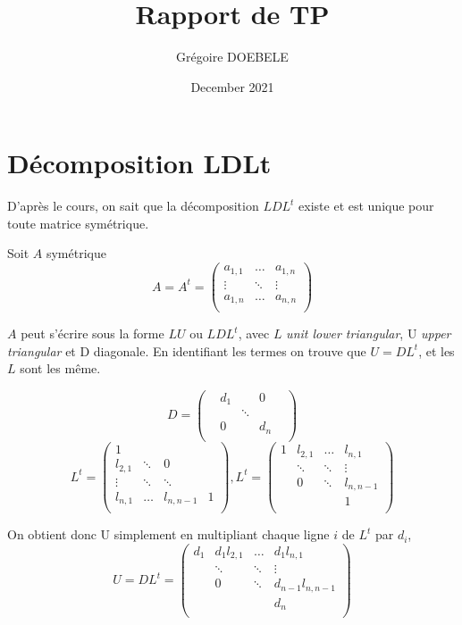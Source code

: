 \documentclass{article}
\title{Rapport de TP}
\author{Grégoire DOEBELE }
\date{December 2021}
\begin{document}
\maketitle

\section{Décomposition LDLt}

D'après le cours, on sait que la décomposition \(LDL^t\) existe et est unique pour toute matrice symétrique.

Soit \(A\) symétrique
\[
	A = A^t = 
	\begin{pmatrix}
	a_{1,1}	& \dots	& a_{1,n} 	\\
	\vdots	& \ddots& \vdots	\\
	a_{1,n}	& \dots & a_{n,n} 	\\
	\end{pmatrix}
\]

\(A\) peut s'écrire sous la forme \(LU\) ou \(LDL^t\), avec \(L\) \textit{unit lower triangular}, U \textit{upper triangular} et D diagonale.
En identifiant les termes on trouve que \(U = DL^t\), et les \(L\) sont les même.

\[
	D = 
	\begin{pmatrix}
	&d_1	& 		& 0&	\\
	&		& \ddots& &		\\
	& 0	& 		& d_n & 	\\
	\end{pmatrix}
\]
\[	
	L^t = 
	\begin{pmatrix}
	1		& 	& 	&  	\\
	l_{2,1}	& \ddots&0& 	\\
	\vdots	& \ddots & \ddots&  \\
	l_{n,1}	& \dots  & l_{n,n-1} & 1 	\\
	\end{pmatrix}, 
	L^t = 
	\begin{pmatrix}
	1		& l_{2,1}& \dots	& l_{n,1} 	\\
			& \ddots&\ddots& \vdots	\\
			& 0 & \ddots& l_{n,n-1} \\
			&  && 1 	\\
	\end{pmatrix}
\]

On obtient donc U simplement en multipliant chaque ligne \(i\) de \(L^t\) par \(d_i\),
\[
	U = DL^t = 
	\begin{pmatrix}
	d_1		& d_1 l_{2,1}& \dots	& d_1 l_{n,1} 	\\
			& \ddots&\ddots& \vdots	\\
			& 0 & \ddots& d_{n-1} l_{n,n-1} \\
			&  && d_n 	\\
	\end{pmatrix}
\]
\end{document}
